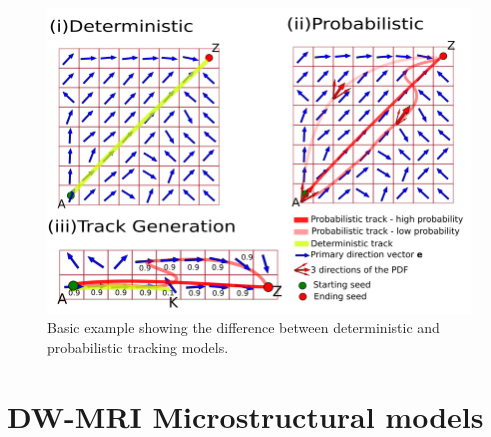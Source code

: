  \begin{figure}[h]
   \centering
   \begin{minipage}[c]{0.6\textwidth}
     \includegraphics[width=\textwidth]{images/det_prob_tract.png}
   \end{minipage}\hfill
   \begin{minipage}[b]{0.37\textwidth}
      \caption{Basic example showing the difference between deterministic and probabilistic tracking models. \cite{phdthesisGaryfallidis}}
      \label{fig:det_prob_tract}
   \end{minipage}
\end{figure}

\section{DW-MRI Microstructural models}
